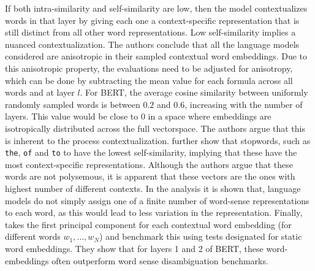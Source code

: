 \documentclass[a4paper,12pt,oneside,openright]{report}
\begin{document}
If both intra-similarity and self-similarity are low, then the model contextualizes words in that layer by giving each one a context-specific representation that is still distinct from all other word representations.
Low self-similarity implies a nuanced contextualization.
The authors conclude that all the language models considered are anisotropic in their sampled contextual word embeddings.
Due to this anisotropic property, the evaluations need to be adjusted for anisotropy, which can be done by subtracting the mean value for each formula across all words and at layer $l$. 
For BERT, the average cosine similarity between uniformly randomly sampled words is between $0.2$ and $0.6$, increasing with the number of layers.
This value would be close to 0 in a space where embeddings are isotropically distributed across the full vectorspace.
The authors argue that this is inherent to the process contextualization.
\cite{ethayarajh19} further show that stopwords, such as \texttt{the}, \texttt{of} and \texttt{to} to have the lowest self-similarity, implying that these have the most context-specific representations.
Although the authors argue that these words are not polysemous, it is apparent that these vectors are the ones with highest number of different contexts.
In the analysis it is shown that, language models do not simply assign one of a finite number of word-sense representations to each word, as this would lead to less variation in the representation.
Finally, \cite{ethayarajh19} takes the first principal component for each contextual word embedding (for different words $w_1, \ldots, w_N$) and benchmark this using tests designated for static word embeddings. 
They show that for layers 1 and 2 of BERT, these word-embeddings often outperform word sense disambiguation benchmarks.
\\
\end{document}
